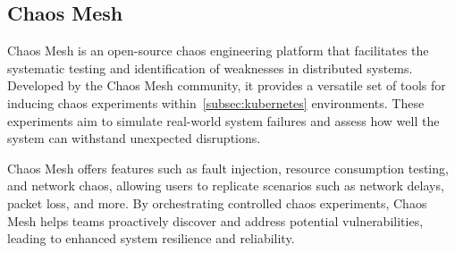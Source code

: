 \subsection{Chaos Mesh}
Chaos Mesh is an open-source chaos engineering platform that facilitates the systematic testing and identification of weaknesses in distributed systems. Developed by the Chaos Mesh community, it provides a versatile set of tools for inducing chaos experiments within~\cref{subsec:kubernetes} environments. These experiments aim to simulate real-world system failures and assess how well the system can withstand unexpected disruptions.

Chaos Mesh offers features such as fault injection, resource consumption testing, and network chaos, allowing users to replicate scenarios such as network delays, packet loss, and more. By orchestrating controlled chaos experiments, Chaos Mesh helps teams proactively discover and address potential vulnerabilities, leading to enhanced system resilience and reliability.~\cite{noauthor_chaos_nodate}